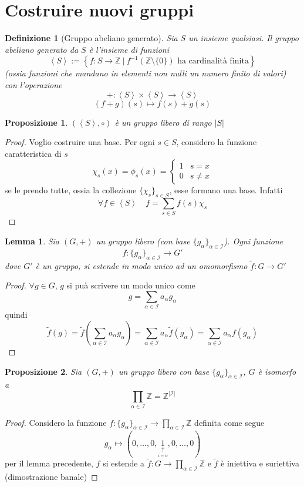\documentclass[a4paper]{report}
\newtheorem{proposition}{Proposizione}
\newtheorem{definition}{Definizione}
\newtheorem{lemma}{Lemma}
\newcommand{\Z}{\ensuremath{\mathbb{Z}}}
\newcommand{\ra}{\ensuremath{\rightarrow}}
\newcommand{\setst}[2]{\ensuremath{\left\{{#1}\ |\ {#2}\right\}}}
\newcommand{\gen}[1]{\ensuremath{\left<{#1}\right>}}
\begin{document}
\section{Costruire nuovi gruppi}
\begin{definition}[Gruppo abeliano generato]
    Sia $S$ un insieme qualsiasi. Il gruppo abeliano generato da $S$ è l'insieme di funzioni
    \[
        \gen{S}:=\setst{f:S\ra\Z}{f^{-1}(\Z\setminus\{0\})\text{ ha cardinalità finita}}
    \]
    (ossia funzioni che mandano in elementi non nulli un numero finito di valori) con l'operazione
    \[
        +:\gen{S}\times\gen{S}\ra\gen{S}
    \]
    \[
        (f+g)(s)\mapsto f(s)+g(s)
    \]
\end{definition}
\begin{proposition}
    $(\gen{S},\circ)$ è un gruppo libero di rango $|S|$
\end{proposition}
\begin{proof}
    Voglio costruire una base. Per ogni $s\in S$, considero la funzione caratteristica di $s$
    \[
        \chi_s(x)=\phi_s(x)=\begin{cases}
            1 & s=x     \\
            0 & s\neq x
        \end{cases}
    \]
    se le prendo tutte, ossia la collezione $\{\chi_s\}_{s\in S}$, esse formano una base. Infatti
    \[
        \forall f\in\gen{S}\quad f=\sum_{s\in S}f(s)\chi_s
    \]
\end{proof}
\begin{lemma}
    Sia $(G,+)$ un gruppo libero (con base $\{g_\alpha\}_{\alpha\in\mathcal{I}}$). Ogni funzione
    \[
        f:\{g_\alpha\}_{\alpha\in\mathcal{I}}\ra G'
    \]
    dove $G'$ è un gruppo, si estende in modo unico ad un omomorfismo $\tilde{f}:G\ra G'$
\end{lemma}
\begin{proof}
    $\forall g\in G$, $g$ si puà scrivere un modo unico come
    \[
        g=\sum_{\alpha\in\mathcal{I}}a_\alpha g_\alpha
    \]
    quindi
    \[
        \tilde{f}(g)=\tilde{f}\left(\sum_{\alpha\in\mathcal{I}}a_\alpha g_\alpha\right)=\sum_{\alpha\in\mathcal{I}}a_\alpha\tilde{f}(g_\alpha)=\sum_{\alpha\in\mathcal{I}}a_\alpha f(g_\alpha)
    \]
\end{proof}
\begin{proposition}
    Sia $(G,+)$ un gruppo libero con base $\{g_\alpha\}_{\alpha\in\mathcal{I}}$, $G$ è isomorfo a
    \[
        \prod_{\alpha\in\mathcal{I}}\Z=\Z^{|\mathcal{I}|}
    \]
\end{proposition}
\begin{proof}
    Considero la funzione $f:\{g_\alpha\}_{\alpha\in\mathcal{I}}\ra\prod_{\alpha\in\mathcal{I}}\Z$ definita come segue
    \[
        g_\alpha\mapsto(0,\dots,0,\underset{\underset{i=\alpha}{\uparrow}}{1},0,\dots,0)
    \]
    per il lemma precedente, $f$ si estende a $\tilde{f}:G\ra\prod_{\alpha\in\mathcal{I}}\Z$ e $\tilde{f}$ è iniettiva e suriettiva (dimostrazione banale)
\end{proof}
\end{document}
